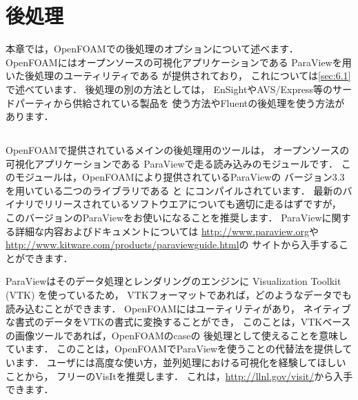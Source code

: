\chapter{後処理}
\label{chap:6}
%
本章では，OpenFOAMでの後処理のオプションについて述べます．
OpenFOAMにはオープンソースの可視化アプリケーションである
ParaViewを用いた後処理のユーティリティである
が提供されており，
これについては\autoref{sec:6.1}で述べています．
後処理の別の方法としては，
EnSightやAVS/Express等のサードパーティから供給されている製品を
使う方法やFluentの後処理を使う方法があります．



\section{}
\label{sec:6.1}
%
%
%
%
%
%
OpenFOAMで提供されているメインの後処理用のツールは，
オープンソースの可視化アプリケーションである
ParaViewで走る読み込みのモジュールです．
このモジュールは，OpenFOAMにより提供されているParaViewの
バージョン3.3を用いている二つのライブラリである
%
%
と
%
%
にコンパイルされています．
最新のバイナリでリリースされているソフトウエアについても適切に走るはずですが，
このバージョンのParaViewをお使いになることを推奨します．
ParaViewに関する詳細な内容およびドキュメントについては
\url{http://www.paraview.org}や
\url{http://www.kitware.com/products/paraviewguide.html}の
サイトから入手することができます．

ParaViewはそのデータ処理とレンダリングのエンジンに
Visualization Toolkit (VTK) を使っているため，
VTKフォーマットであれば，どのようなデータでも読み込むことができます．
OpenFOAMにはユーティリティがあり，
ネイティブな書式のデータをVTKの書式に変換することができ，
このことは，VTKベースの画像ツールであれば，OpenFOAMのcaseの
後処理として使えることを意味しています．
このことは，OpenFOAMでParaViewを使うことの代替法を提供しています．
ユーザには高度な使い方，並列処理における可視化を経験してほしいことから，
フリーのVisItを推奨します．
これは，\url{http://llnl.gov/visit/}から入手できます．

